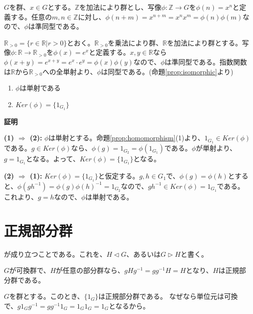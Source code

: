 \documentclass[dvipdfmx,autodetect-engine]{jsarticle}
\begin{document}
\exam $G$を群、$x \in G$とする。$\mathbb{Z}$を加法により群とし、写像$\phi: \mathbb{Z} \to G$を$\phi(n) = x^n$と定義する。任意の$m, n \in \mathbb{Z}$に対し、$\phi(n + m) = x^{n + m} = x^nx^m = \phi(n)\phi(m)$なので、$\phi$は準同型である。

\exam $\mathbb{R}_{>0} = \{r \in \mathbb{R} | r > 0\}$とおく。$\mathbb{R}_{>0}$を乗法により群、$\mathbb{R}$を加法により群とする。写像$\phi:\mathbb{R} \to \mathbb{R}_{>0}$を$\phi(x) = e^x$と定義する。$x, y \in \mathbb{R}$なら$\phi(x+y) = e^{x+y} = e^x \cdot e^y = \phi(x)\phi(y)$なので、$\phi$は準同型である。指数関数は$\mathbb{R}$から$\mathbb{R}_{>0}$への全単射より、$\phi$は同型である。(命題\ref{prop:isomorphic}より)


\label{prop:hommSingkeUnitKerAndInjective}

\begin{enumerate}
\renewcommand{\labelenumi}{(\arabic{enumi})}
\item $\phi$は単射である
\item $Ker(\phi) = \{1_{G_1}\}$
\end{enumerate}

{\bf 証明}

{\bf (1) $\Rightarrow$ (2):} $\phi$は単射とする。命題\ref{prop:homomorphism}(1)より、$1_{G_1} \in Ker({\phi})$である。$g \in Ker(\phi)$なら、$\phi(g) = 1_{G_2} = \phi(1_{G_1})$である。$\phi$が単射より、$g = 1_{G_1}$となる。よって、$Ker(\phi) = \{1_{G_1}\}$となる。

{\bf (2) $\Rightarrow$ (1):} $Ker(\phi) = \{1_{G_1}\}$と仮定する。$g, h \in G_1$で、$\phi(g) = \phi(h)$とすると、$\phi(gh^{-1}) = \phi(g)\phi(h)^{-1} = 1_{G_2}$なので、$gh^{-1} \in Ker(\phi) = {1_{G_1}}$である。これより、$g = h$なので、$\phi$は単射である。

\section{正規部分群}

が成り立つことである。これを、$H \triangleleft G$、あるいは$G \triangleright H$と書く。

\exam $G$が可換群で、$H$が任意の部分群なら、$gHg^{-1} = gg^{-1}H = H$となり、$H$は正規部分群である。

\exam $G$を群とする。このとき、$\{1_G\}$は正規部分群である。
なぜなら単位元は可換で、$g1_Gg^{-1} = gg^{-1}1_G = 1_G1_G = 1_G$となるから。
\end{document}
